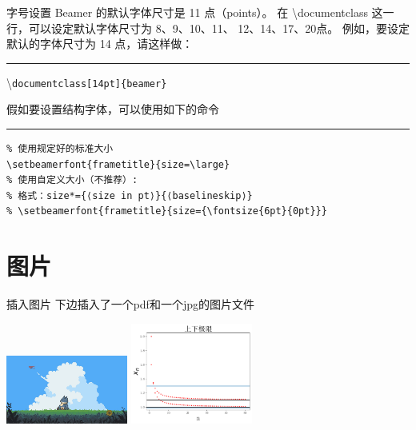 \documentclass[10pt]{beamer}
\begin{document}
\begin{frame}[fragile]{字号设置}
  Beamer 的默认字体尺寸是 11 点（points）。 
  在 \textbackslash documentclass 这一行，可以设定默认字体尺寸为 
  8、9、10、11、 12、14、17、20点。
  例如，要设定默认的字体尺寸为 14 点，请这样做：
  \rule{0.6\linewidth}{1pt}
  \textbackslash \texttt{documentclass[14pt]\{beamer\}}
  \vspace*{3em}

  假如要设置结构字体，可以使用如下的命令
  \rule{0.6\linewidth}{1pt}
  \begin{Verbatim}
% 使用规定好的标准大小
\setbeamerfont{frametitle}{size=\large}
% 使用自定义大小（不推荐）:
% 格式：size*={⟨size in pt⟩}{⟨baselineskip⟩}
% \setbeamerfont{frametitle}{size={\fontsize{6pt}{0pt}}}
  \end{Verbatim}
\end{frame}


\section{图片}
\begin{frame}{插入图片}
  下边插入了一个pdf和一个jpg的图片文件
  \begin{center} 
    \includegraphics[width=0.3\textwidth]{./pics/cover.png} 
    \includegraphics[width=0.3\textwidth]{./pics/limits.pdf} 
  \end{center}  
\end{frame}
\end{document}

